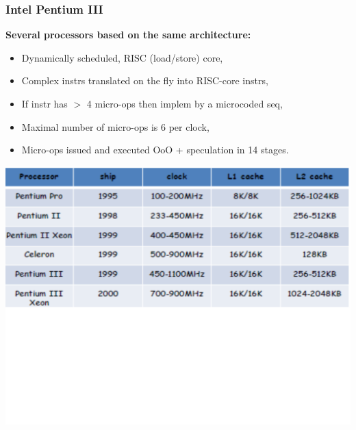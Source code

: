 \documentclass{beamer}
\newcommand{\emp}[1]{\textcolor{DikuRed}{ #1}}
\begin{document}
\begin{frame}[fragile,t]
\frametitle{Intel Pentium III}

\emp{\bf Several processors based on the same architecture:}
\begin{itemize}
\item Dynamically scheduled, RISC (load/store) core,
\item Complex instrs translated on the fly into RISC-core instrs,
\item If instr has $>$ 4 micro-ops then implem by a microcoded seq,
\item Maximal number of micro-ops is 6 per clock,
\item Micro-ops issued and executed OoO + speculation in 14 stages.
\end{itemize}

\includegraphics[width=70ex]{FigsOoOProc/Pnetiums.pdf}

\end{frame}
\end{document}
